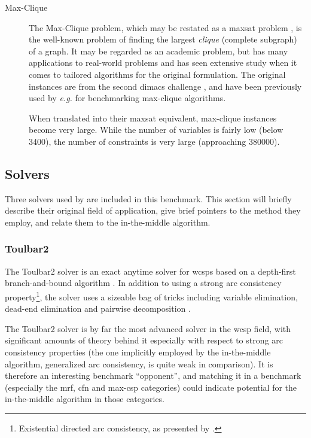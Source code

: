 \begin{description}
	\item[Max-Clique]
		The Max-Clique problem, which may be restated as a \gls{maxsat} problem \parencite{Heras08}, is the well-known problem of finding the largest \emph{clique} (complete subgraph) of a graph.
		It may be regarded as an academic problem, but has many applications to real-world problems and has seen extensive study when it comes to tailored algorithms for the original formulation.
		The original instances are from the second \gls{dimacs} challenge \parencite{Johnson96}, and have been previously used by \emph{e.g.} \textcite{Östergård02} for benchmarking max-clique algorithms.

		When translated into their \gls{maxsat} equivalent, max-clique instances become very large. While the number of variables is fairly low (below \num{3400}), the number of constraints is very large (approaching \num{380000}).
\end{description}

\subsection{Solvers}
Three solvers used by \textcite{deGivry14} are included in this benchmark.
This section will briefly describe their original field of application, give brief pointers to the method they employ, and relate them to the in-the-middle algorithm.

\subsubsection{Toulbar2}
The Toulbar2 solver is an exact anytime solver for \glspl{wcsp} based on a depth-first branch-and-bound algorithm \parencite{Allouche10}.
In addition to using a strong arc consistency property\footnote{Existential directed arc consistency, as presented by \textcite{deGivry05}.}, the solver uses a sizeable bag of tricks including variable elimination, dead-end elimination \parencite{deGivry13} and pairwise decomposition \parencite{Favier11}.

The Toulbar2 solver is by far the most advanced solver in the \gls{wcsp} field, with significant amounts of theory behind it especially with respect to strong arc consistency properties (the one implicitly employed by the in-the-middle algorithm, generalized arc consistency, is quite weak in comparison).
It is therefore an interesting benchmark \enquote{opponent}, and matching it in a benchmark (especially the \gls{mrf}, \gls{cfn} and max-\gls{csp} categories) could indicate potential for the in-the-middle algorithm in those categories.

